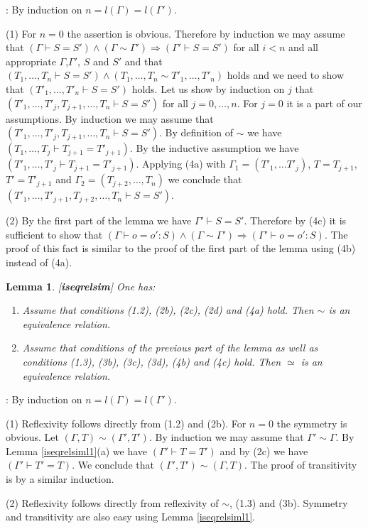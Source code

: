 \documentclass[11pt]{article}
\newenvironment{proof}{{\bf Proof}:}{\vskip 5mm }
\newtheorem{lemma}[proposition]{Lemma}
\newcommand{\llabel}[1]{\label{#1}[{\bf #1}]}
\newcommand{\impl}{{\Rightarrow}}
\begin{document}
\begin{proof}
By induction on $n=l(\Gamma)=l(\Gamma')$.

(1) For $n=0$ the assertion is obvious. Therefore by induction we may assume that $(\Gamma\vdash S=S')\wedge(\Gamma\sim\Gamma')\impl (\Gamma'\vdash S=S')$ for all $i<n$ and all appropriate $\Gamma$,$\Gamma'$, $S$ and $S'$ and that $(T_1,\dots,T_n\vdash S=S')\wedge(T_1,\dots,T_n\sim T'_1,\dots,T'_n)$ holds and we need to show that $(T'_1,\dots,T'_n\vdash S=S')$ holds. Let us show by induction on $j$ that $(T'_1,\dots,T'_j,T_{j+1},\dots,T_n\vdash S=S')$ for all $j=0,\dots,n$. For $j=0$ it is a part of our assumptions. By induction we may assume that $(T'_1,\dots,T'_j,T_{j+1},\dots,T_n\vdash S=S')$. By definition of $\sim$ we have $(T_1,\dots,T_j\vdash T_{j+1}=T'_{j+1})$. By the inductive assumption we have $(T'_1,\dots,T'_j\vdash T_{j+1}=T'_{j+1})$. Applying (4a) with $\Gamma_1=(T'_1,\dots T'_j)$, $T=T_{j+1}$, $T'=T'_{j+1}$ and $\Gamma_2=(T_{j+2},\dots,T_n)$ we conclude that $(T'_1,\dots,T'_{j+1},T_{j+2},\dots,T_n\vdash S=S')$.

(2)  By the first part of the lemma we have $\Gamma'\vdash S=S'$. Therefore by (4c) it is sufficient to show that $(\Gamma\vdash o=o':S)\wedge(\Gamma\sim\Gamma')\impl (\Gamma'\vdash o=o':S)$. The proof of this fact is similar to the proof of the first part of the lemma using (4b) instead of (4a).  
\end{proof}
%
\begin{lemma}
\llabel{iseqrelsim}
One has:
%
\begin{enumerate}
\item Assume that conditions (1.2), (2b), (2c), (2d) and (4a) hold. Then $\sim$ is an equivalence relation.
\item Assume that conditions of the previous part of the lemma as well as conditions (1.3), (3b), (3c), (3d), (4b) and (4c) hold. Then $\simeq$ is an equivalence relation. 
\end{enumerate}
\end{lemma}
%
\begin{proof}
By induction on $n=l(\Gamma)=l(\Gamma')$. 

(1) Reflexivity follows directly from (1.2) and (2b). For $n=0$ the symmetry is obvious. Let $(\Gamma,T)\sim(\Gamma',T')$. By induction we may assume that $\Gamma'\sim\Gamma$. By Lemma \ref{iseqrelsiml1}(a) we have $(\Gamma'\vdash T=T')$ and by (2c) we have $(\Gamma'\vdash T'=T)$. We conclude that $(\Gamma',T')\sim(\Gamma,T)$.  The proof of transitivity is by a similar induction.

(2) Reflexivity follows directly from  reflexivity of $\sim$, (1.3) and (3b). Symmetry and transitivity are also easy using Lemma \ref{iseqrelsiml1}.
\end{proof}
\end{document}
